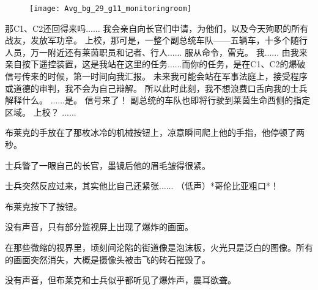 \documentclass[openany]{book}
\begin{document}
\begin{figure}[h]
    \centering
    \texttt{[image: Avg\_bg\_29\_g11\_monitoringroom]}
\end{figure}
\begin{dialogue}
     那C1、C2还回得来吗......
     我会亲自向长官们申请，为他们，以及今天殉职的所有战友，发放军功章。
     上校，那可是，一整个副总统车队——五辆车，十多个随行人员，万一附近还有莱茵职员和记者、行人......
     服从命令，雷克。
     我......
     由我来亲自按下遥控装置，这是我站在这里的任务......而你的任务，是在C1、C2的爆破信号传来的时候，第一时间向我汇报。
     未来我可能会站在军事法庭上，接受程序或道德的审判，我不会为自己辩解。
     所以此时此刻，我不想浪费口舌向我的士兵解释什么。
     ......是。
     信号来了！
     副总统的车队也即将行驶到莱茵生命西侧的指定区域。
     上校？
     ......\par
    布莱克的手放在了那枚冰冷的机械按钮上，凉意瞬间爬上他的手指，他停顿了两秒。\par
    士兵瞥了一眼自己的长官，墨镜后他的眉毛皱得很紧。\par
    士兵突然反应过来，其实他比自己还紧张......
     （低声）*哥伦比亚粗口*！
\end{dialogue}
\par
布莱克按下了按钮。\par
没有声音，只有部分监视屏上出现了爆炸的画面。\par
在那些微缩的视界里，顷刻间沦陷的街道像是泡沫板，火光只是泛白的图像。所有的画面突然消失，大概是摄像头被击飞的砖石摧毁了。\par
没有声音，但布莱克和士兵似乎都听见了爆炸声，震耳欲聋。
\end{document}
